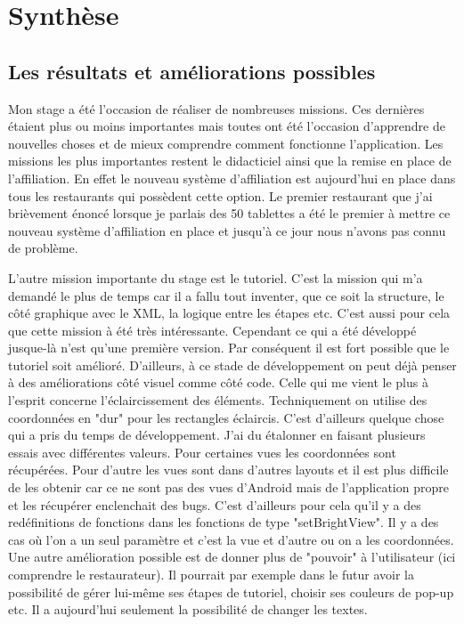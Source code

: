 \chapter{Synthèse}
\label{sec:synthese}
\section{Les résultats et améliorations possibles}

Mon stage a été l'occasion de réaliser de nombreuses missions. Ces dernières étaient plus ou moins importantes mais toutes ont été l'occasion d'apprendre de nouvelles choses et de mieux comprendre comment fonctionne l'application. Les missions les plus importantes restent le didacticiel ainsi que la remise en place de l'affiliation. En effet le nouveau système d'affiliation est aujourd'hui en place dans tous les restaurants qui possèdent cette option. Le premier restaurant que j'ai brièvement énoncé lorsque je parlais des 50 tablettes a été le premier à mettre ce nouveau système d'affiliation en place et jusqu'à ce jour nous n'avons pas connu de problème. 

L'autre mission importante du stage est le tutoriel. C'est la mission qui m'a demandé le plus de temps car il a fallu tout inventer, que ce soit la structure, le côté graphique avec le XML, la logique entre les étapes etc. C'est aussi pour cela que cette mission à été très intéressante. Cependant ce qui a été développé jusque-là n'est qu'une première version. Par conséquent il est fort possible que le tutoriel soit amélioré. D'ailleurs, à ce stade de développement on peut déjà penser à des améliorations côté visuel comme côté code. Celle qui me vient le plus à l'esprit concerne l'éclaircissement des éléments. Techniquement on utilise des coordonnées en "dur" pour les rectangles éclaircis. C'est d'ailleurs quelque chose qui a pris du temps de développement. J'ai du étalonner en faisant plusieurs essais avec différentes valeurs. Pour certaines vues les coordonnées sont récupérées. Pour d'autre les vues sont dans d'autres layouts et il est plus difficile de les obtenir car ce ne sont pas des vues d'Android mais de l'application propre et les récupérer enclenchait des bugs. C'est d'ailleurs pour cela qu'il y a des redéfinitions de fonctions dans les fonctions de type "setBrightView". Il y a des cas où l'on a un seul paramètre et c'est la vue et d'autre ou on a les coordonnées. Une autre amélioration possible est de donner plus de "pouvoir" à l'utilisateur (ici comprendre le restaurateur). Il pourrait par exemple dans le futur avoir la possibilité de gérer lui-même ses étapes de tutoriel, choisir ses couleurs de pop-up etc. Il a aujourd'hui seulement la possibilité de changer les textes.

